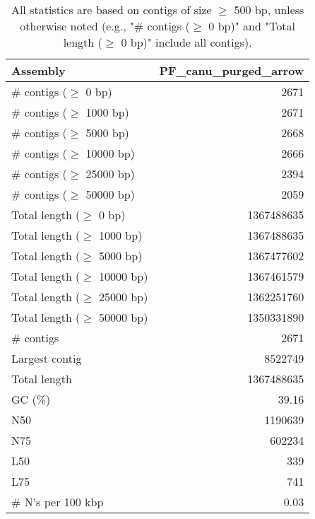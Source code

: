 \documentclass[12pt,a4paper]{article}
\begin{document}
\begin{table}[ht]
\begin{center}
\caption{All statistics are based on contigs of size $\geq$ 500 bp, unless otherwise noted (e.g., "\# contigs ($\geq$ 0 bp)" and "Total length ($\geq$ 0 bp)" include all contigs).}
\begin{tabular}{|l*{1}{|r}|}
\hline
Assembly & PF\_canu\_purged\_arrow \\ \hline
\# contigs ($\geq$ 0 bp) & 2671 \\ \hline
\# contigs ($\geq$ 1000 bp) & 2671 \\ \hline
\# contigs ($\geq$ 5000 bp) & 2668 \\ \hline
\# contigs ($\geq$ 10000 bp) & 2666 \\ \hline
\# contigs ($\geq$ 25000 bp) & 2394 \\ \hline
\# contigs ($\geq$ 50000 bp) & 2059 \\ \hline
Total length ($\geq$ 0 bp) & 1367488635 \\ \hline
Total length ($\geq$ 1000 bp) & 1367488635 \\ \hline
Total length ($\geq$ 5000 bp) & 1367477602 \\ \hline
Total length ($\geq$ 10000 bp) & 1367461579 \\ \hline
Total length ($\geq$ 25000 bp) & 1362251760 \\ \hline
Total length ($\geq$ 50000 bp) & 1350331890 \\ \hline
\# contigs & 2671 \\ \hline
Largest contig & 8522749 \\ \hline
Total length & 1367488635 \\ \hline
GC (\%) & 39.16 \\ \hline
N50 & 1190639 \\ \hline
N75 & 602234 \\ \hline
L50 & 339 \\ \hline
L75 & 741 \\ \hline
\# N's per 100 kbp & 0.03 \\ \hline
\end{tabular}
\end{center}
\end{table}
\end{document}
